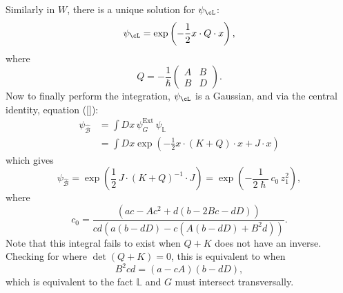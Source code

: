     Similarly in \(W\), there is a unique solution for \( \psi_{\cL}\):
    \begin{align*}
        \psi_{\cL} =  \exp \left( -\frac{1}{2}   x \cdot Q \cdot  x \right),
    \end{align*}
    where 
    \[ Q = - \frac{1}{\hslash} \left( \begin{array}{cc}
        A  &  B \\
        B & D  
    \end{array}\right).\]
    Now to finally perform the integration, \( \psi_{\cL}\) is a Gaussian, and via the central identity, equation (\ref{}):
    \begin{align*} \psi_{\widehat{\mathcal{B}}} &= \int D x \, \psi_{G}^{\text{Ext}} \,  \psi_{\mathbb{L}}  \\ 
    &= \int Dx \exp \left( -\frac{1}{2} x \cdot (K+Q) \cdot x + J \cdot x \right) 
    \end{align*}
    which gives
    \[ \psi_{\widehat{\mathcal{B}}} = \exp \left( \frac12\, J\cdot (K+Q)^{-1} \cdot J \right) = \exp\left( -\frac{1}{2 \hslash}\, c_0\, z_1^2\right),\]
    where 
    \[ c_0 = \frac{\left(a c-A c^2+d (b-2 B c-d D)\right)}{ c d  \left(a (b-d D)-c \left(A (b-d D)+B^2 d\right)\right)}.\]
    Note that this integral fails to exist when \(Q+K\) does not have an inverse.  Checking for where \( \det(Q+K) = 0\), this is equivalent to when
    \[ B^2 c d = (a -  c A) ( b - d D), \]
    which is equivalent to the fact \( \mathbb{L}\) and \(G\) must intersect transversally.
    

